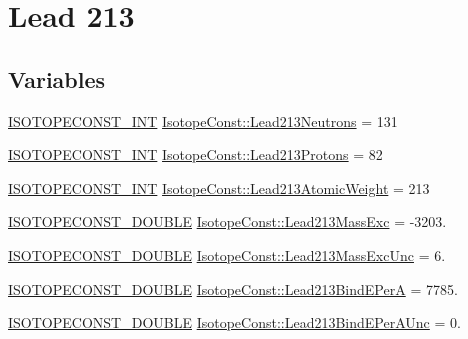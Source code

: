 \hypertarget{group___isotope_const-_lead-_pb213}{}\section{Lead 213}
\label{group___isotope_const-_lead-_pb213}
\subsection*{Variables}
\begin{DoxyCompactItemize}
\item 
\mbox{\hyperlink{group___isotope_const-_macros_ga5f18360b3e99483a35c32d789e62621c}{I\+S\+O\+T\+O\+P\+E\+C\+O\+N\+S\+T\+\_\+\+I\+NT}} \mbox{\hyperlink{group___isotope_const-_lead-_pb213_ga4fbe2f4caef2e83da7bf3b444422f95c}{Isotope\+Const\+::\+Lead213\+Neutrons}} = 131
\item 
\mbox{\hyperlink{group___isotope_const-_macros_ga5f18360b3e99483a35c32d789e62621c}{I\+S\+O\+T\+O\+P\+E\+C\+O\+N\+S\+T\+\_\+\+I\+NT}} \mbox{\hyperlink{group___isotope_const-_lead-_pb213_gaed8443f41eb70c8d70a56c89ca4ce3fa}{Isotope\+Const\+::\+Lead213\+Protons}} = 82
\item 
\mbox{\hyperlink{group___isotope_const-_macros_ga5f18360b3e99483a35c32d789e62621c}{I\+S\+O\+T\+O\+P\+E\+C\+O\+N\+S\+T\+\_\+\+I\+NT}} \mbox{\hyperlink{group___isotope_const-_lead-_pb213_gaba0809692e972778adaaf837d68f4e4c}{Isotope\+Const\+::\+Lead213\+Atomic\+Weight}} = 213
\item 
\mbox{\hyperlink{group___isotope_const-_macros_ga8f45a7272ce02c0b4c65c44636ed719a}{I\+S\+O\+T\+O\+P\+E\+C\+O\+N\+S\+T\+\_\+\+D\+O\+U\+B\+LE}} \mbox{\hyperlink{group___isotope_const-_lead-_pb213_gabfbf46e8e0e777dba7a1adaa9d711347}{Isotope\+Const\+::\+Lead213\+Mass\+Exc}} = -\/3203.
\item 
\mbox{\hyperlink{group___isotope_const-_macros_ga8f45a7272ce02c0b4c65c44636ed719a}{I\+S\+O\+T\+O\+P\+E\+C\+O\+N\+S\+T\+\_\+\+D\+O\+U\+B\+LE}} \mbox{\hyperlink{group___isotope_const-_lead-_pb213_ga3eed443824fa9a9b4589a464d3347891}{Isotope\+Const\+::\+Lead213\+Mass\+Exc\+Unc}} = 6.
\item 
\mbox{\hyperlink{group___isotope_const-_macros_ga8f45a7272ce02c0b4c65c44636ed719a}{I\+S\+O\+T\+O\+P\+E\+C\+O\+N\+S\+T\+\_\+\+D\+O\+U\+B\+LE}} \mbox{\hyperlink{group___isotope_const-_lead-_pb213_ga5ca4c8cab646db12106920f8ba2a6997}{Isotope\+Const\+::\+Lead213\+Bind\+E\+PerA}} = 7785.
\item 
\mbox{\hyperlink{group___isotope_const-_macros_ga8f45a7272ce02c0b4c65c44636ed719a}{I\+S\+O\+T\+O\+P\+E\+C\+O\+N\+S\+T\+\_\+\+D\+O\+U\+B\+LE}} \mbox{\hyperlink{group___isotope_const-_lead-_pb213_ga952953ad8116b59d39a2a76f9fda1640}{Isotope\+Const\+::\+Lead213\+Bind\+E\+Per\+A\+Unc}} = 0.

\end{DoxyCompactItemize}
